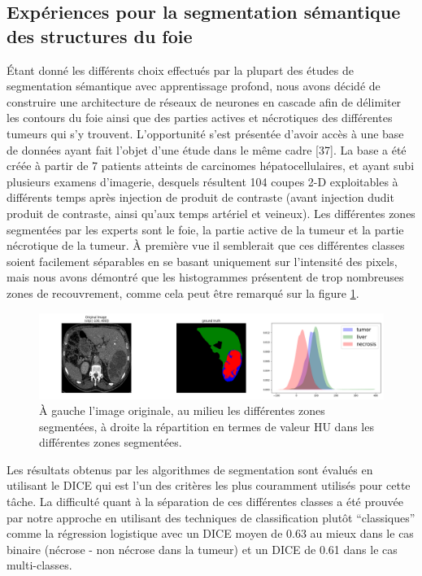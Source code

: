 \documentclass[]{memoir}
\begin{document}
\subsection{Expériences pour la segmentation sémantique des structures du foie}
Étant donné les différents choix effectués par la plupart des études de segmentation sémantique avec apprentissage profond, nous avons décidé de construire une architecture de réseaux de neurones en cascade afin de délimiter les contours du foie ainsi que des parties actives et nécrotiques des différentes tumeurs qui s’y trouvent.
L’opportunité s’est présentée d’avoir accès à une base de données ayant fait l’objet d’une étude dans le même cadre [37].
La base a été créée à partir de 7 patients atteints de carcinomes hépatocellulaires, et ayant subi plusieurs examens d’imagerie, desquels résultent 104 coupes 2-D exploitables à différents temps après injection de produit de contraste (avant injection dudit produit de contraste, ainsi qu’aux temps artériel et veineux).
Les différentes zones segmentées par les experts sont le foie, la partie active de la tumeur et la partie nécrotique de la tumeur. À première vue il semblerait que ces différentes classes soient facilement séparables en se basant uniquement sur l’intensité des pixels, mais nous avons démontré que les histogrammes présentent de trop nombreuses zones de recouvrement, comme cela peut être remarqué sur la figure \ref{fig:hist}.

\begin{figure}
\centering
\includegraphics[width=0.7\linewidth]{images/hist}
\caption{À gauche l’image originale, au milieu les différentes zones segmentées, à droite la répartition en termes de valeur HU dans les différentes zones segmentées.}
\label{fig:hist}
\end{figure}


Les résultats obtenus par les algorithmes de segmentation sont évalués en utilisant le DICE qui est l’un des critères les plus couramment utilisés pour cette tâche.
La difficulté quant à la séparation de ces différentes classes a été prouvée par notre approche en utilisant des techniques de classification plutôt “classiques” comme la régression logistique avec un DICE moyen de 0.63 au mieux dans le cas binaire (nécrose - non nécrose dans la tumeur) et un DICE de 0.61 dans le cas multi-classes.
\end{document}
